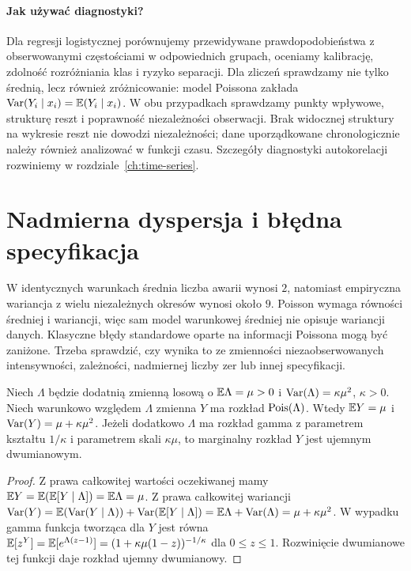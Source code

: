 \paragraph{Jak używać diagnostyki?}
Dla regresji logistycznej porównujemy przewidywane
prawdopodobieństwa z obserwowanymi częstościami
w odpowiednich grupach, oceniamy kalibrację,
zdolność rozróżniania klas i ryzyko separacji.
Dla zliczeń sprawdzamy nie tylko średnią, lecz również
zróżnicowanie: model Poissona zakłada
$\operatorname{Var}(Y_i\mid x_i)=\mathbb E(Y_i\mid x_i)$.
W obu przypadkach sprawdzamy punkty wpływowe,
strukturę reszt i poprawność niezależności obserwacji.
Brak widocznej struktury na wykresie reszt nie dowodzi
niezależności; dane uporządkowane chronologicznie należy
również analizować w funkcji czasu. Szczegóły diagnostyki
autokorelacji rozwiniemy w rozdziale~\ref{ch:time-series}.

\section{Nadmierna dyspersja i błędna specyfikacja}
\begin{przyklad}
W identycznych warunkach średnia liczba awarii
wynosi $2$, natomiast empiryczna wariancja z
wielu niezależnych okresów wynosi około $9$.
Poisson wymaga równości średniej i wariancji,
więc sam model warunkowej średniej nie opisuje
wariancji danych. Klasyczne błędy standardowe
oparte na informacji Poissona mogą być zaniżone.
Trzeba sprawdzić, czy wynika to ze zmienności
niezaobserwowanych intensywności, zależności,
nadmiernej liczby zer lub innej specyfikacji.
\end{przyklad}

\begin{stwierdzenie}
\label{prop:poisson-gamma}
Niech $\Lambda$ będzie dodatnią zmienną losową o
$\mathbb E\Lambda=\mu>0$ i $\operatorname{Var}(\Lambda)=\kappa\mu^2$,
$\kappa>0$. Niech warunkowo względem $\Lambda$
zmienna $Y$ ma rozkład $\operatorname{Pois}(\Lambda)$.
Wtedy $\mathbb E Y=\mu$ i
$\operatorname{Var}(Y)=\mu+\kappa\mu^2$.
Jeżeli dodatkowo $\Lambda$ ma rozkład gamma z
parametrem kształtu $1/\kappa$ i parametrem skali
$\kappa\mu$, to marginalny rozkład $Y$ jest
ujemnym dwumianowym.
\end{stwierdzenie}
\begin{proof}
Z prawa całkowitej wartości oczekiwanej mamy
$\mathbb E Y=\mathbb E(\mathbb E[Y\mid\Lambda])=\mathbb E\Lambda=\mu$.
Z prawa całkowitej wariancji
$\operatorname{Var}(Y)=\mathbb E(\operatorname{Var}(Y\mid\Lambda))+
\operatorname{Var}(\mathbb E[Y\mid\Lambda])=
\mathbb E\Lambda+\operatorname{Var}(\Lambda)=\mu+\kappa\mu^2$.
W wypadku gamma funkcja tworząca dla $Y$ jest równa
$\mathbb E[z^Y]=\mathbb E[e^{\Lambda(z-1)}]
=(1+\kappa\mu(1-z))^{-1/\kappa}$
dla $0\le z\le1$. Rozwinięcie dwumianowe tej
funkcji daje rozkład ujemny dwumianowy.
\end{proof}

